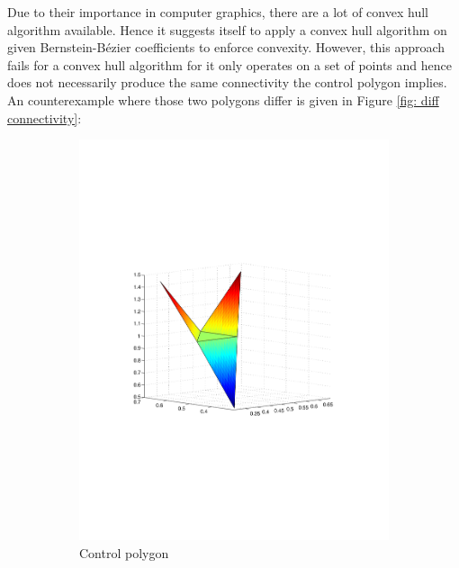 Due to their importance in computer graphics, there are a lot of convex hull algorithm available. Hence it suggests itself to apply a convex hull algorithm on given Bernstein-B\'ezier coefficients to enforce convexity. However, this approach fails for a convex hull algorithm for it only operates on a set of points and hence does not necessarily produce the same connectivity the control polygon implies. An counterexample where those two polygons differ is given in Figure \ref{fig: diff connectivity}:
\begin{figure}[h]
\begin{subfigure}[b]{.5\textwidth}
	\includegraphics[trim=3cm 8cm 3cm 8cm, width=1.\textwidth]{control_polygon2.pdf}
	\caption{Control polygon}
\end{subfigure}
\begin{subfigure}[b]{.5\textwidth}

\end{subfigure}
\end{figure}
